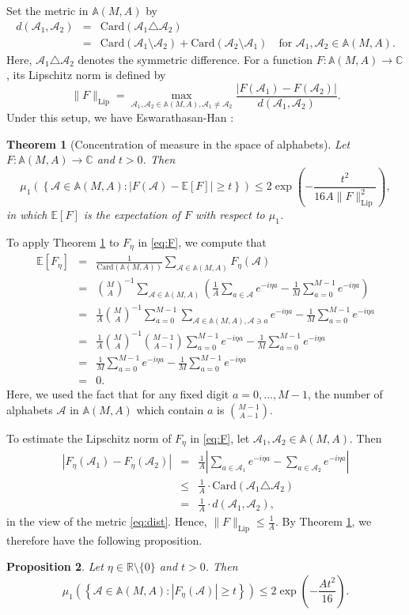 \documentclass[12pt,reqno]{amsart}
\newcommand\Ab{\mathbb{A}}
\newcommand\Ac{\mathcal{A}}
\newcommand\C{\mathbb{C}}
\newcommand\Card{\mathrm{Card}}
\newcommand\E{\mathbb{E}}
\newcommand\Lip{\mathrm{Lip}}
\newcommand\R{\mathbb{R}}
\theoremstyle{plain}
\newtheorem{thm}{\textbf{Theorem}}[section]
\newtheorem{prop}[thm]{\textbf{Proposition}}
\theoremstyle{remark}
\numberwithin{equation}{section}
\begin{document}
Set the metric in $\Ab(M,A)$ by
\begin{eqnarray}
d(\Ac_1,\Ac_2)&=&\Card\left(\Ac_1\triangle\Ac_2\right)\nonumber\\
&=&\Card(\Ac_1\setminus\Ac_2)+\Card(\Ac_2\setminus\Ac_1)\quad\text{for }\Ac_1,\Ac_2\in\Ab(M,A).\label{eq:dist}
\end{eqnarray}
Here, $\Ac_1\triangle\Ac_2$ denotes the symmetric difference. For a function $F:\Ab(M,A)\to\C$, its Lipschitz norm is defined by
$$\|F\|_\Lip=\max_{\Ac_1,\Ac_2\in\Ab(M,A),\Ac_1\ne\Ac_2}\frac{|F(\Ac_1)-F(\Ac_2)|}{d(\Ac_1,\Ac_2)}.$$
Under this setup, we have Eswarathasan-Han \cite[Theorem 2.1]{EH}:
\begin{thm}[Concentration of measure in the space of alphabets]\label{thm:comA}
Let $F:\Ab(M,A)\to\C$ and $t>0$. Then
$$\mu_1\left(\left\{\Ac\in\Ab(M,A):|F(\Ac)-\E[F]|\ge t\right\}\right)\le2\exp\left(-\frac{t^2}{16A\|F\|^2_\Lip}\right),$$
in which $\E[F]$ is the expectation of $F$ with respect to $\mu_1$.
\end{thm}
To apply Theorem \ref{thm:comA} to $F_\eta$ in \eqref{eq:F}, we compute that
\begin{eqnarray*}
\E\left[F_\eta\right]&=&\frac{1}{\Card\left(\Ab(M,A)\right)}\sum_{\Ac\in\Ab(M,A)}F_\eta(\Ac)\\
&=&{M\choose A}^{-1}\sum_{\Ac\in\Ab(M,A)}\left(\frac1A\sum_{a\in\Ac}e^{-i\eta a}-\frac1M\sum_{a=0}^{M-1}e^{-i\eta a}\right)\\
&=&\frac1A{M\choose A}^{-1}\sum_{a=0}^{M-1}\sum_{\Ac\in\Ab(M,A),\Ac\ni a}e^{-i\eta a}-\frac1M\sum_{a=0}^{M-1}e^{-i\eta a}\\
&=&\frac1A{M\choose A}^{-1}{M-1\choose A-1}\sum_{a=0}^{M-1}e^{-i\eta a}-\frac1M\sum_{a=0}^{M-1}e^{-i\eta a}\\
&=&\frac1M\sum_{a=0}^{M-1}e^{-i\eta a}-\frac1M\sum_{a=0}^{M-1}e^{-i\eta a}\\
&=&0.
\end{eqnarray*}
Here, we used the fact that for any fixed digit $a=0,...,M-1$, the number of alphabets $\Ac$ in $\Ab(M,A)$ which contain $a$ is ${M-1\choose A-1}$. 

To estimate the Lipschitz norm of $F_\eta$ in \eqref{eq:F}, let $\Ac_1,\Ac_2\in\Ab(M,A)$. Then
\begin{eqnarray*}
\left|F_\eta\left(\Ac_1\right)-F_\eta\left(\Ac_2\right)\right|&=&\frac1A\left|\sum_{a\in\Ac_1}e^{-i\eta a}-\sum_{a\in\Ac_2}e^{-i\eta a}\right|\\
&\le&\frac1A\cdot\Card(\Ac_1\triangle\Ac_2)\\
&=&\frac1A\cdot d(\Ac_1,\Ac_2),
\end{eqnarray*}
in the view of the metric \eqref{eq:dist}. Hence, $\|F\|_\Lip\le\frac1A$. By Theorem \ref{thm:comA}, we therefore have the following proposition.
\begin{prop}\label{prop:comA}
Let $\eta\in\R\setminus\{0\}$ and $t>0$. Then
$$\mu_1\left(\left\{\Ac\in\Ab(M,A):\left|F_\eta(\Ac)\right|\ge t\right\}\right)\le2\exp\left(-\frac{At^2}{16}\right).$$
\end{prop}
\end{document}
